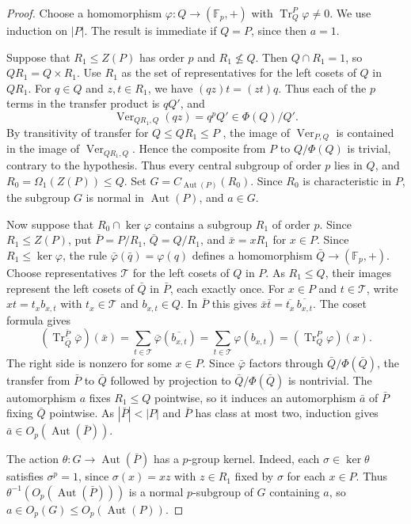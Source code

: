 \documentclass[11pt,a4paper]{article}
\theoremstyle{definition}
\theoremstyle{remark}
\numberwithin{equation}{section}
\newcommand{\Fp}{\mathbb{F}_p}
\DeclareMathOperator{\Aut}{Aut}
\begin{document}
	\begin{proof}
		Choose a homomorphism $\varphi:Q\to(\Fp,+)$ with
		$\operatorname{Tr}_{Q}^P\varphi\ne0$. We use induction on $|P|$.
		The result is immediate if $Q=P$, since then $a=1$.
		
		Suppose that $R_1\le Z(P)$ has order $p$ and $R_1\nleq Q$.
		Then $Q\cap R_1=1$, so $QR_1=Q\times R_1$. Use $R_1$ as the set of
		representatives for the left cosets of $Q$ in $QR_1$. For $q\in Q$ and
		$z,t\in R_1$, we have $(qz)t=(zt)q$. Thus each of the $p$ terms in the
		transfer product is $qQ'$, and
		\[
		\operatorname{Ver}_{QR_1,Q}(qz)=q^pQ'\in\Phi(Q)/Q'.
		\]
		By transitivity of transfer for $Q\le QR_1\le P$
		\cite[Theorem~10.8]{Isaacs2008}, the image of
		$\operatorname{Ver}_{P,Q}$ is contained in the image of $\operatorname{Ver}_{QR_1,Q}$.
		Hence the composite from $P$ to $Q/\Phi(Q)$ is trivial, contrary to the
		hypothesis. Thus every central subgroup of order $p$ lies in $Q$, and
		$R_0=\Omega_1(Z(P))\le Q$. Set $G=C_{\Aut(P)}(R_0)$. Since $R_0$ is
		characteristic in $P$, the subgroup $G$ is normal in $\Aut(P)$, and $a\in G$.
		
		Now suppose that $R_0\cap\ker\varphi$ contains a subgroup $R_1$ of order $p$.
		Since $R_1\le Z(P)$, put $\bar P=P/R_1$, $\bar Q=Q/R_1$, and $\bar x=xR_1$
		for $x\in P$. Since $R_1\le\ker\varphi$, the rule
		$\bar\varphi(\bar q)=\varphi(q)$ defines a homomorphism $\bar Q\to(\Fp,+)$.
		Choose representatives $\mathcal T$ for the left cosets of $Q$ in $P$.
		As $R_1\le Q$, their images represent the left cosets of $\bar Q$ in $\bar P$,
		each exactly once. For $x\in P$ and $t\in\mathcal T$, write $xt=t_x b_{x,t}$
		with $t_x\in\mathcal T$ and $b_{x,t}\in Q$. In $\bar P$ this gives
		$\bar x\bar t=\overline{t_x}\,\overline{b_{x,t}}$. The coset formula gives
		\[
		(\operatorname{Tr}_{\bar Q}^{\bar P}\bar\varphi)(\bar x)
		=\sum_{t\in\mathcal T}\bar\varphi(\overline{b_{x,t}})
		=\sum_{t\in\mathcal T}\varphi(b_{x,t})
		=(\operatorname{Tr}_Q^P\varphi)(x).
		\]
		The right side is nonzero for some $x\in P$. Since $\bar\varphi$ factors
		through $\bar Q/\Phi(\bar Q)$, the transfer from $\bar P$ to $\bar Q$
		followed by projection to $\bar Q/\Phi(\bar Q)$ is nontrivial.
		The automorphism $a$ fixes $R_1\le Q$ pointwise, so it induces an automorphism
		$\bar a$ of $\bar P$ fixing $\bar Q$ pointwise. As $|\bar P|<|P|$ and $\bar P$
		has class at most two, induction gives $\bar a\in O_p(\Aut(\bar P))$.
		
		The action $\theta:G\to\Aut(\bar P)$ has a $p$-group kernel. Indeed, each $\sigma\in\ker\theta$ satisfies $\sigma^p=1$, since
		$\sigma(x)=xz$ with $z\in R_1$ fixed by $\sigma$ for each $x\in P$.
		Thus $\theta^{-1}(O_p(\Aut(\bar P)))$ is a normal $p$-subgroup of $G$
		containing $a$, so $a\in O_p(G)\le O_p(\Aut(P))$.
		

\end{proof}
\end{document}

